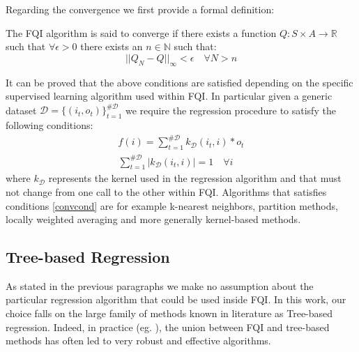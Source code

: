 	\noindent Regarding the convergence we first provide a formal definition:
	\begin{definition}
		The FQI algorithm is said to converge if there exists a function $Q: S \times A \rightarrow \mathbb{R}$ such that
		$\forall \epsilon > 0$ there exists an $n \in \mathbb{N}$ such that:
		\begin{equation*}
			||Q_N - Q||_{\infty} < \epsilon \quad \forall N > n
		\end{equation*}
	\end{definition}
	\noindent It can be proved that the above conditions are satisfied depending on the specific supervised learning algorithm
	used within FQI.\newline
	In particular given a generic dataset $\mathcal{D} = \{(i_t, o_t)\}_{t=1}^{\#\mathcal{D}}$ we require the regression procedure
	to satisfy the following conditions:
	\begin{equation}
		\begin{split}
			f(i) = \sum_{t=1}^{\#\mathcal{D}} k_{\mathcal{D}} (i_t,i)*o_t \\
			\sum_{t=1}^{\#\mathcal{D}} |k_{\mathcal{D}}(i_t,i)| = 1 \quad \forall i
			\label{convcond}
		\end{split}
	\end{equation}
	\noindent where $k_{\mathcal{D}}$ represents the kernel used in the regression algorithm and that must not change
	from one call to the other within FQI.\newline
	Algorithms that satisfies conditions \ref{convcond} are for example k-nearest neighbors, partition methods, locally weighted averaging and
	more generally kernel-based methods.

	\subsection{Tree-based Regression}
		\noindent As stated in the previous paragraphs we make no assumption about the particular regression algorithm that could be
		used inside FQI. In this work, our choice falls on the large family of methods known in literature as Tree-based regression.\newline
		Indeed, in practice (eg. \cite{lazaric2008transfer}), the union between FQI and tree-based methods has often led to very
		robust and effective algorithms.

